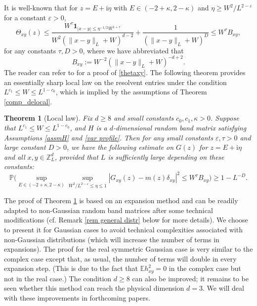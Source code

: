 \documentclass{article}
\newcommand{\1}{\mathds{1}}
\numberwithin{equation}{section}
\newcommand{\be}{\begin{equation}}
\newcommand{\ee}{\end{equation}}
\newcommand{\e}{{\varepsilon}}
\newcommand{\ii}{\mathrm{i}} %
\renewcommand{\leq}{\leqslant}
\renewcommand{\geq}{\geqslant}
\renewcommand{\le}{\leq}
\renewcommand{\ge}{\geq}
\renewcommand{\P}{\mathbb{P}}
\newcommand{\E}{\mathbb{E}}
\newcommand{\Z}{\mathbb{Z}}
\DeclareMathOperator{\OO}{O}
\theoremstyle{plain} %
\newtheorem{theorem}{Theorem}[section]
\theoremstyle{remark}
\newcommand{\cor}{\color{red}}
\newcommand{\nc}{\normalcolor}
\begin{document}
It is well-known that
for $z=E+\ii \eta$ with $E\in (-2+\kappa,2-\kappa)$ and $\eta\ge W^{2}/L^{2-\e}$ for a constant $\e>0$,
\be\label{thetaxy}
\Theta_{xy}(z) \le   \frac{W^\tau \mathbf 1_{|x-y|\le   \eta^{-1/2}W^{1+\tau}}}{W^2\left(\|x-y\|_{ L}+W\right)^{d-2}}   + \frac{1}{ \left(\|x-y\|_{ L}+W\right)^{D}}  \le W^{\tau} B_{xy},
\ee
for any constants $\tau, D>0$, where we have abbreviated that 
\be\label{defnBxy}B_{xy}:=W^{-2}\left(\|x-y\|_{ L}+W\right)^{-d+2}.\ee 
The reader can refer to \cite{delocal,PartIII} for a proof of \eqref{thetaxy}. 
The following theorem provides an essentially sharp local law on the resolvent entries under the condition $L^{c_1}\le W\le L^{1-c_0}$, which is implied by the assumptions of Theorem \ref{comp_delocal}.


\begin{theorem}[Local law]\label{main thm0}
Fix $d\ge 8$ and small constants $c_0,c_1,\kappa>0$. Suppose that $L^{c_1} \le W \le L^{1-c_0}$, and $H$ is a $d$-dimensional random band matrix satisfying Assumptions \ref{assmH} and \ref{var profile}. Then for any small constants $\e,\tau>0$ and large constant $D>0$, we have the following estimate on $G(z)$ for $z=E+\ii \eta$ and all $x,y \in \Z_{L}^d$, provided that $L$ is sufficiently large depending on these constants: %
\be\label{locallaw}
\P\bigg(\sup_{E\in (-2+\kappa, 2- \kappa)}\sup_{W^{2}/L^{2-\e}\le \eta\le 1} |G_{xy} (z) -m(z)\delta_{xy}|^2 \le  W^\tau B_{xy}\bigg) \ge 1- L^{-D} . %
\ee
\end{theorem}


The proof of Theorem \ref{main thm0} is based on an expansion method and can be readily adapted to non-Gaussian random band matrices after some technical modifications (cf. Remark \ref{rem general distr} below for more details).  We choose to present it  for Gaussian cases to avoid technical complexities associated with non-Gaussian distributions (which will increase the number of terms in  expansions). The proof for the real symmetric Gaussian case is very similar to the complex case except that, as usual, the number of terms will double in every expansion step.  (This is due to the fact that $\E h_{xy}^2 = 0$ in the complex case but not in the real case.) The condition $d\ge 8$ can also be improved; it remains to be seen whether this method can  reach the physical dimension $d=3$. 
We will deal with  these  improvements in forthcoming papers.
\end{document}
